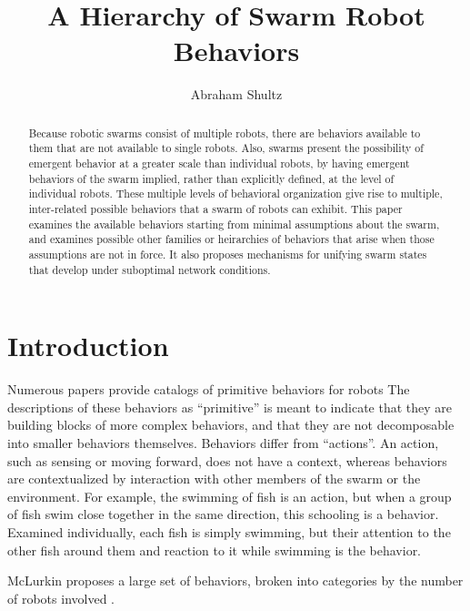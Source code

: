 \documentclass[]{article}
\title{A Hierarchy of Swarm Robot Behaviors}
\author{Abraham Shultz}
\begin{document}
\maketitle

\begin{abstract}
Because robotic swarms consist of multiple robots, there are behaviors available to them that are not available to single robots. Also, swarms present the possibility of emergent behavior at a greater scale than individual robots, by having emergent behaviors of the swarm implied, rather than explicitly defined, at the level of individual robots. These multiple levels of behavioral organization give rise to multiple, inter-related possible behaviors that a swarm of robots can exhibit. This paper examines the available behaviors starting from minimal assumptions about the swarm, and examines possible other families or heirarchies of behaviors that arise when those assumptions are not in force. It also proposes mechanisms for unifying swarm states that develop under suboptimal network conditions. 

\end{abstract}

\section{Introduction}

Numerous papers provide catalogs of primitive behaviors for robots 
The descriptions of these behaviors as ``primitive'' is meant to indicate that they are building blocks of more complex behaviors, and that they are not decomposable into smaller behaviors themselves. 
Behaviors differ from ``actions''. 
An action, such as sensing or moving forward, does not have a context, whereas behaviors are contextualized by interaction with other members of the swarm or the environment.
For example, the swimming of fish is an action, but when a group of fish swim close together in the same direction, this schooling is a behavior. 
Examined individually, each fish is simply swimming, but their attention to the other fish around them and reaction to it while swimming is the behavior. 
 
McLurkin proposes a large set of behaviors, broken into categories by the number of robots involved \cite{mclurkin2004stupid}.
\end{document}

